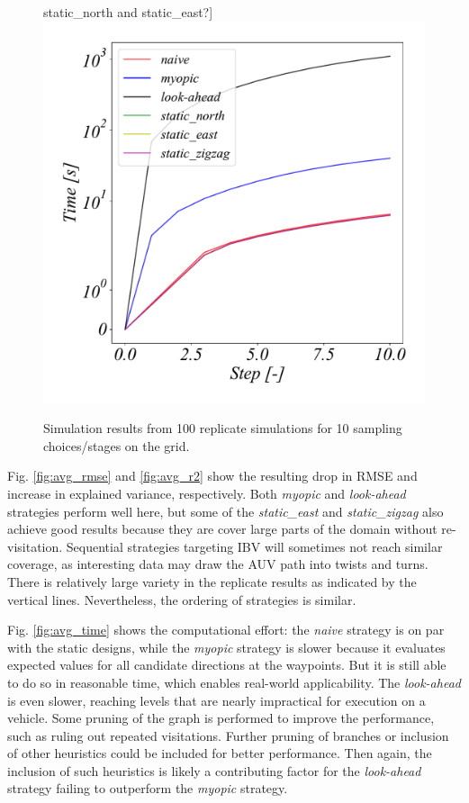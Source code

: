 \documentclass[aoas]{imsart}
\begin{document}
\begin{figure}[h!]
{    static\_north and static\_east?}]{\label{fig:avg_time}\includegraphics[height=0.49\textwidth]{Figures/sim/avg_Time.pdf}} 
\caption{Simulation results from 100 replicate simulations for 10
  sampling choices/stages on the grid. }  
\label{fig:sim_results}
\end{figure}

Fig. \ref{fig:avg_rmse} and \ref{fig:avg_r2} show the resulting drop
in RMSE and increase in explained variance, respectively. Both
\textit{myopic} and \textit{look-ahead} strategies perform well here,
but some of the \textit{static\_east} and \textit{static\_zigzag} also
achieve good results because they are cover large
parts of the domain without re-visitation. Sequential strategies
targeting IBV will sometimes not reach similar coverage, as
interesting data may draw the AUV path into twists and turns. There is
relatively large variety in the replicate results as indicated by the
vertical lines. Nevertheless, the ordering of strategies is similar.


Fig. \ref{fig:avg_time} shows the computational effort: the
\textit{naive} strategy is on par with the static designs, while the
\textit{myopic} strategy is slower because it evaluates expected values for all candidate directions at the waypoints. But it is still able to do so in reasonable time, which enables real-world applicability. The \textit{look-ahead} is even
slower, reaching levels that are nearly impractical for execution on a
vehicle. Some pruning of the graph is performed to improve the
performance, such as ruling out repeated visitations. Further pruning of branches or
inclusion of other heuristics could be included for better
performance. Then again, the inclusion of such heuristics is likely a
contributing factor for the \textit{look-ahead} strategy failing to
outperform the \textit{myopic} strategy.
\end{document}

